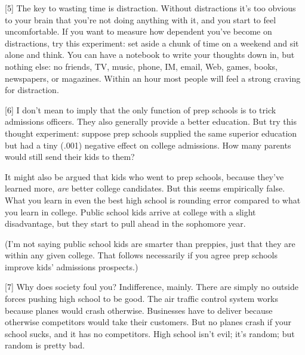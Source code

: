 [5] The key to wasting time is
                  distraction. Without distractions it's too obvious to your
                  brain that you're not doing anything with it, and you start to
                  feel uncomfortable. If you want to measure how dependent
                  you've become on distractions, try this experiment: set aside
                  a chunk of time on a weekend and sit alone and think. You can
                  have a notebook to write your thoughts down in, but nothing
                  else: no friends, TV, music, phone, IM, email, Web, games,
                  books, newspapers, or magazines. Within an hour most people
                  will feel a strong craving for distraction.

[6] I
                  don't mean to imply that the only function of prep schools is
                  to trick admissions officers. They also generally provide a
                  better education. But try this thought experiment: suppose
                  prep schools supplied the same superior education but had a
                  tiny (.001) negative effect on college admissions. How many
                  parents would still send their kids to them?

It
                  might also be argued that kids who went to prep schools,
                  because they've learned more, \emph{are} better college
                  candidates. But this seems empirically false. What you learn
                  in even the best high school is rounding error compared to
                  what you learn in college. Public school kids arrive at
                  college with a slight disadvantage, but they start to pull
                  ahead in the sophomore year.

(I'm not saying public
                  school kids are smarter than preppies, just that they are
                  within any given college. That follows necessarily if you
                  agree prep schools improve kids' admissions prospects.)

[7]
                  Why does society foul you? Indifference, mainly. There are
                  simply no outside forces pushing high school to be good. The
                  air traffic control system works because planes would crash
                  otherwise. Businesses have to deliver because otherwise
                  competitors would take their customers. But no planes crash if
                  your school sucks, and it has no competitors. High school
                  isn't evil; it's random; but random is pretty bad.

